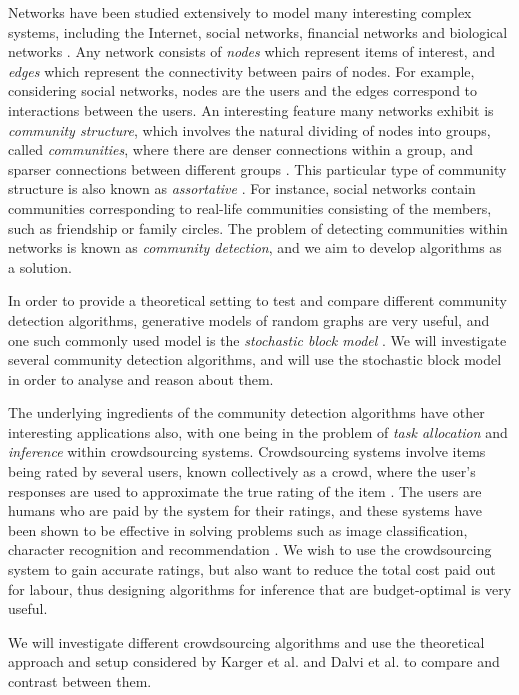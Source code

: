 \documentclass[12pt]{article}
\numberwithin{equation}{section}
\begin{document}
Networks have been studied extensively to model many interesting complex systems, including the Internet, social networks, financial networks and biological networks \cite{New06a,DKM+13,MG13}. Any network consists of \textit{nodes} which represent items of interest, and \textit{edges} which represent the connectivity between pairs of nodes. For example, considering social networks, nodes are the users and the edges correspond to interactions between the users. An interesting feature many networks exhibit is \textit{community structure}, which involves the natural dividing of nodes into groups, called \textit{communities}, where there are denser connections within a group, and sparser connections between different groups \cite{New06a,DKM+13,For10,New06b}. This particular type of community structure is also known as \textit{assortative} \cite{DKM+13}. For instance, social networks contain communities corresponding to real-life communities consisting of the members, such as friendship or family circles. The problem of detecting communities within networks is known as \textit{community detection}, and we aim to develop algorithms as a solution.

In order to provide a theoretical setting to test and compare different community detection algorithms, generative models of random graphs are very useful, and one such commonly used model is the \textit{stochastic block model} \cite{DKM+13,NN12}. We will investigate several community detection algorithms, and will use the stochastic block model in order to analyse and reason about them.

The underlying ingredients of the community detection algorithms have other interesting applications also, with one being in the problem of \textit{task allocation} and \textit{inference} within crowdsourcing systems. Crowdsourcing systems involve items being rated by several users, known collectively as a crowd, where the user's responses are used to approximate the true rating of the item \cite{KOS13,EHR12}. The users are humans who are paid by the system for their ratings, and these systems have been shown to be effective in solving problems such as image classification, character recognition and recommendation \cite{KOS13}. We wish to use the crowdsourcing system to gain accurate ratings, but also want to reduce the total cost paid out for labour, thus designing algorithms for inference that are budget-optimal is very useful.

We will investigate different crowdsourcing algorithms and use the theoretical approach and setup considered by Karger et al.\cite{KOS13} and Dalvi et al. \cite{DDK+13} to compare and contrast between them.
\end{document}
